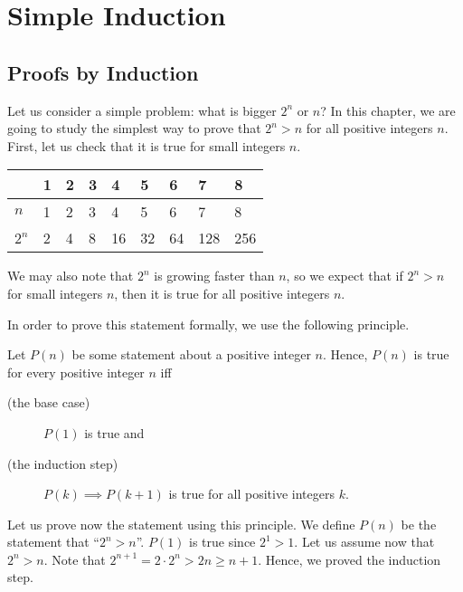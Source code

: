 \chapter{Simple Induction}
\label{chapter:simple-induction}
\section{Proofs by Induction}

Let us consider a simple problem: what is bigger $2^n$ or $n$? In this chapter,
we are going to study the simplest way to prove that $2^n > n$ for all positive
integers $n$. First, let us check that it is true for small integers $n$.
\begin{center}
  \begin{tabular}{l l l  l  l  l  l  l  l}
    \toprule
          & 1 & 2 & 3 & 4  & 5  & 6  & 7   & 8   \\
    \midrule
    $n$   & 1 & 2 & 3 & 4  & 5  & 6  & 7   & 8   \\
    $2^n$ & 2 & 4 & 8 & 16 & 32 & 64 & 128 & 256 \\
    \bottomrule
  \end{tabular}
\end{center}
We may also note that $2^n$ is growing faster than $n$, so we expect that if
$2^n > n$ for small integers $n$, then it is true for all positive integers $n$.

In order to prove this statement formally, we use the following principle.
\begin{principle}
  Let $P(n)$ be some statement about a positive integer $n$.
  Hence, $P(n)$ is true for every positive integer $n$ iff
  \begin{description}
    \item [(the base case)] $P(1)$ is true and
    \item [(the induction step)] $P(k) \implies P(k + 1)$ is true
      for all positive integers $k$.
  \end{description}
\end{principle}

Let us prove now the statement using this principle.
We define $P(n)$ be the statement that ``$2^n > n$''.
$P(1)$ is true since $2^1 > 1$. Let us assume now that $2^n > n$. Note that
$2^{n + 1} = 2 \cdot 2^n > 2n \ge n + 1$. Hence, we proved the induction step.


